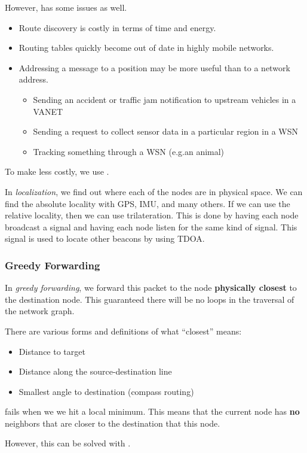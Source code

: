However,  has some issues as well.
\begin{itemize}[noitemsep]
\item Route discovery is costly in terms of time and energy.
\item Routing tables quickly become out of date in highly mobile
  networks.
\item Addressing a message to a position may be more useful than
  to a network address.
  \begin{itemize}[noitemsep]
  \item Sending an accident or traffic jam notification to upstream vehicles in a VANET
  \item Sending a request to collect sensor data in a particular region in a WSN
  \item Tracking something through a WSN (e.g.\@ an animal)
  \end{itemize}
\end{itemize}

To make  less costly, we use .
\begin{definition}[Localization]\label{def:Localization}
  In \emph{localization}, we find out where each of the nodes are in physical space.
  We can find the absolute locality with GPS, IMU, and many others.
  If we can use the relative locality, then we can use trilateration.
  This is done by having each node broadcast a signal and having each node listen for the same kind of signal.
  This signal is used to locate other beacons by using TDOA.\@
\end{definition}

\subsubsection{Greedy Forwarding}\label{subsubsec:Greedy_Forwarding}
\begin{definition}\label{def:Greedy_Forwarding}
  In \emph{greedy forwarding}, we forward this packet to the node \textbf{physically closest} to the destination node.
  This guaranteed there will be no loops in the traversal of the network graph.

  There are various forms and definitions of what ``closest'' means:
  \begin{itemize}[noitemsep]
  \item Distance to target
  \item Distance along the source-destination line
  \item Smallest angle to destination (compass routing)
  \end{itemize}

  \begin{remark}\label{rmk:Greedy_Forward_Fail}
     fails when we we hit a local minimum.
    This means that the current node has \textbf{no} neighbors that are closer to the destination that this node.

    However, this can be solved with .
  \end{remark}
\end{definition}

